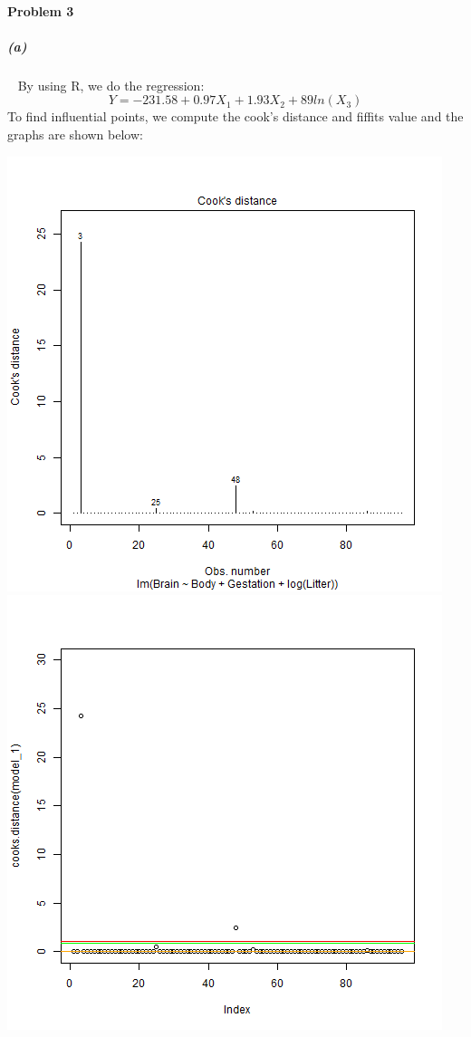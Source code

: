 \documentclass[12pt,a4paper]{article}
\begin{document}
\paragraph{Problem 3}
\subparagraph{(a)}~{}
By using R, we do the regression:
\[Y = -231.58 + 0.97X_1 + 1.93X_2 + 89ln(X_3)\]
To find influential points, we compute the cook's distance and fiffits value and the graphs are shown below:\\
\begin{center}
\includegraphics[scale= 0.6]{3_a_1.png}\\
\includegraphics[scale=0.6]{3_a_2.png}\\

\end{center}
\end{document}
